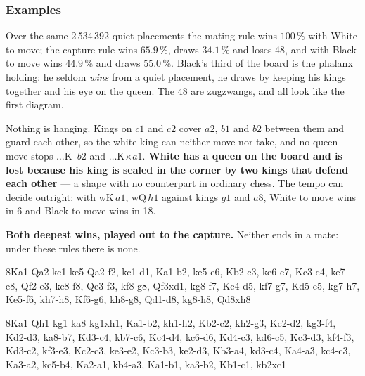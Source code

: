 \documentclass[10pt]{article}
\begin{document}
\subsubsection{Examples}\label{sub:cap-deepest}

\noindent
Over the same 2\,534\,392 quiet placements the mating rule wins $100\,\%$ with
White to move; the capture rule wins $65.9\,\%$, draws $34.1\,\%$ and loses 48,
and with Black to move wins $44.9\,\%$ and draws $55.0\,\%$. Black's third of
the board is the phalanx holding: he seldom \emph{wins} from a quiet placement,
he draws by keeping his kings together and his eye on the queen. The 48 are
zugzwangs, and all look like the first diagram.

\medskip
\noindent
\begin{minipage}[t]{0.30\textwidth}
\end{minipage}\hfill
\begin{minipage}[t]{0.66\textwidth}\vspace{0pt}\small
Nothing is hanging. Kings on $c1$ and $c2$ cover $a2$, $b1$ and $b2$ between
them and guard each other, so the white king can neither move nor take, and no
queen move stops $\ldots$K--$b2$ and $\ldots$K$\times a1$. \textbf{White has a
queen on the board and is lost because his king is sealed in the corner by two
kings that defend each other} --- a shape with no counterpart in ordinary
chess. The tempo can decide outright: with wK\,$a1$, wQ\,$h1$ against kings
$g1$ and $a8$, White to move wins in 6 and Black to move wins in 18.
\end{minipage}

\medskip
\noindent
\textbf{Both deepest wins, played out to the capture.} Neither ends in a mate:
under these rules there is none.

\medskip
\noindent
\begin{minipage}[t]{0.46\textwidth}
\begin{stepboard}[width=\linewidth,board=3.55cm,height=51mm,variant=C,
  intro={wK $a1$, wQ $a2$ vs kings $c1$ and $e5$ --- \textbf{White wins, 13
  moves}}]{8}{Ka1 Qa2 kc1 ke5}
  Qa2-f2, kc1-d1, Ka1-b2, ke5-e6, Kb2-c3, ke6-e7, Kc3-c4, ke7-e8,
  Qf2-e3, ke8-f8, Qe3-f3, kf8-g8, Qf3xd1, kg8-f7, Kc4-d5, kf7-g7,
  Kd5-e5, kg7-h7, Ke5-f6, kh7-h8, Kf6-g6, kh8-g8, Qd1-d8, kg8-h8, Qd8xh8
\end{stepboard}
\end{minipage}\hfill
\begin{minipage}[t]{0.46\textwidth}
\begin{stepboard}[width=\linewidth,board=3.55cm,height=51mm,variant=C,
  intro={wK $a1$, wQ $h1$ vs kings $g1$ and $a8$ --- \textbf{Black wins, 18
  moves}}]{8}{Ka1 Qh1 kg1 ka8}
  kg1xh1, Ka1-b2, kh1-h2, Kb2-c2, kh2-g3, Kc2-d2, kg3-f4, Kd2-d3,
  ka8-b7, Kd3-c4, kb7-c6, Kc4-d4, kc6-d6, Kd4-c3, kd6-c5, Kc3-d3,
  kf4-f3, Kd3-c2, kf3-e3, Kc2-c3, ke3-e2, Kc3-b3, ke2-d3, Kb3-a4,
  kd3-c4, Ka4-a3, kc4-c3, Ka3-a2, kc5-b4, Ka2-a1, kb4-a3, Ka1-b1,
  ka3-b2, Kb1-c1, kb2xc1
\end{stepboard}
\end{minipage}
\end{document}
